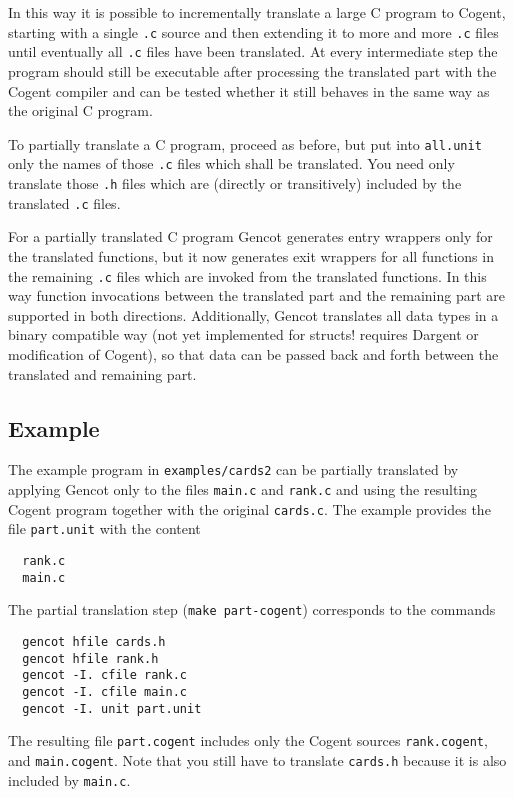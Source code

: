 \documentclass[a4paper]{report}
\newcommand{\code}[1]{\textnormal{\texttt{#1}}}
\begin{document}
In this way it is possible to incrementally translate a large C program to Cogent, starting with a single \code{.c} 
source and then extending it to more and more \code{.c} files until eventually all \code{.c} files have been translated.
At every intermediate step the program should still be executable after processing the translated part with the Cogent
compiler and can be tested whether it still behaves in the same way as the original C program.

To partially translate a C program, proceed as before, but put into \code{all.unit} only the names of those \code{.c}
files which shall be translated. You need only translate those \code{.h} files which are (directly or transitively)
included by the translated \code{.c} files. 

For a partially translated C program Gencot generates entry wrappers only for the translated functions, but it now
generates exit wrappers for all functions in the remaining \code{.c} files which are invoked from the translated functions.
In this way function invocations between the translated part and the remaining part are supported in both directions.
Additionally, Gencot translates all data types in a binary compatible way (not yet implemented for structs! requires Dargent 
or modification of Cogent), so that data can be passed back and forth between the translated and remaining part.

\subsection{Example}

The example program in \code{examples/cards2} can be partially translated by applying Gencot only to the files \code{main.c}
and \code{rank.c} and using the resulting Cogent program together with the original \code{cards.c}. The example provides
the file \code{part.unit} with the content
\begin{verbatim}
  rank.c
  main.c
\end{verbatim}

The partial translation step (\code{make part-cogent}) corresponds to the commands
\begin{verbatim}
  gencot hfile cards.h
  gencot hfile rank.h
  gencot -I. cfile rank.c
  gencot -I. cfile main.c
  gencot -I. unit part.unit
\end{verbatim}
The resulting file \code{part.cogent} includes only the Cogent sources \code{rank.cogent}, and
\code{main.cogent}. Note that you still have to translate \code{cards.h} because it is also included by \code{main.c}.
\end{document}
